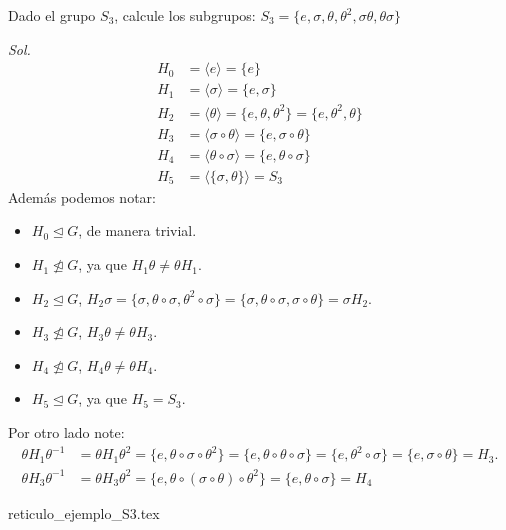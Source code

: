 \begin{eje}
	Dado el grupo $S_3$, calcule los subgrupos: $S_3 = \{e, \sigma, \theta, \theta^2, \sigma\theta, \theta\sigma\}$
\end{eje}
\textit{ Sol. }
\begin{align*}
	H_0 & = \langle e \rangle = \{e\}                                                  \\
	H_1 & = \langle \sigma \rangle = \{e, \sigma\}                                     \\
	H_2 & = \langle \theta \rangle = \{e, \theta, \theta^2\} = \{e, \theta^2, \theta\} \\
	H_3 & = \langle \sigma \circ \theta \rangle = \{e, \sigma \circ \theta\}           \\
	H_4 & = \langle \theta \circ \sigma \rangle = \{e, \theta \circ \sigma\}           \\
	H_5 & = \langle \{\sigma, \theta\} \rangle = S_3
\end{align*}
Además podemos notar:
\begin{itemize}
	\item $H_0 \trianglelefteq G$, de manera trivial.
	\item $H_1 \not\trianglelefteq G$, ya que $H_1 \theta \neq \theta H_1$.
	\item $H_2 \trianglelefteq G$, $H_2 \sigma = \{\sigma, \theta \circ \sigma, \theta^2 \circ \sigma\} = \{\sigma, \theta \circ \sigma, \sigma \circ \theta\} = \sigma H_2$.
	\item $H_3 \not\trianglelefteq G$, $H_3 \theta \neq \theta H_3$.
	\item $H_4 \not\trianglelefteq G$, $H_4 \theta \neq \theta H_4$.
	\item $H_5 \trianglelefteq G$, ya que $H_5 = S_3$.
\end{itemize}

Por otro lado note:
\begin{align*}
	\theta H_1 \theta^{-1} & = \theta H_1 \theta^2 = \{e, \theta \circ \sigma \circ \theta^2\} = \{e, \theta \circ \theta \circ \sigma\} = \{e, \theta^2 \circ \sigma\} = \{e, \sigma \circ \theta\} = H_3. \\
	\theta H_3 \theta^{-1} & = \theta H_3 \theta^2 = \{e, \theta \circ (\sigma \circ \theta) \circ \theta^2\} = \{e, \theta \circ \sigma\} = H_4
\end{align*}

{reticulo_ejemplo_S3.tex}


